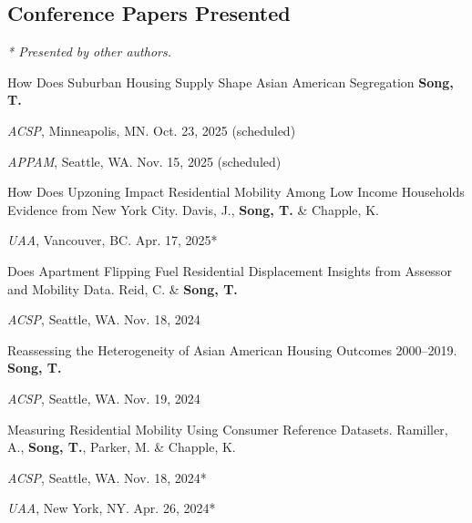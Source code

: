 \documentclass[11pt,letterpaper]{article}
\newcommand{\listitemspace}{0.25em}
\renewenvironment{itemize}
{\begin{list}{}{\setlength{\leftmargin}{1em}
\setlength{\parskip}{0em}
\setlength{\itemsep}{\listitemspace}
\setlength{\parsep}{\listitemspace}}}
{\end{list}}
\newcommand{\term}[1]{(#1)}     %
\begin{document}
\subsection{Conference Papers Presented}
{\footnotesize\emph{* Presented by other authors.}}
\begin{itemize}
  \item How Does Suburban Housing Supply Shape Asian American Segregation \textbf{Song, T.}
    \begin{itemize}
      \addtolength{\leftskip}{1em}\setlength{\itemsep}{-0.4em}
      \item[•] \emph{ACSP}, Minneapolis, MN. Oct. 23, 2025 \term{scheduled}
      \item[•] \emph{APPAM}, Seattle, WA. Nov. 15, 2025 \term{scheduled}
    \end{itemize}

  \item How Does Upzoning Impact Residential Mobility Among Low Income Households Evidence from New York City. Davis, J., \textbf{Song, T.} \& Chapple, K.
    \begin{itemize}
      \addtolength{\leftskip}{1em}\setlength{\itemsep}{-0.4em}
      \item[•] \emph{UAA}, Vancouver, BC. Apr. 17, 2025*
    \end{itemize}

  \item Does Apartment Flipping Fuel Residential Displacement Insights from Assessor and Mobility Data. Reid, C. \& \textbf{Song, T.}
    \begin{itemize}
      \addtolength{\leftskip}{1em}\setlength{\itemsep}{-0.4em}
      \item[•] \emph{ACSP}, Seattle, WA. Nov. 18, 2024
    \end{itemize}

  \item Reassessing the Heterogeneity of Asian American Housing Outcomes 2000–2019. \textbf{Song, T.}
    \begin{itemize}
      \addtolength{\leftskip}{1em}\setlength{\itemsep}{-0.4em}
      \item[•] \emph{ACSP}, Seattle, WA. Nov. 19, 2024
    \end{itemize}

  \item Measuring Residential Mobility Using Consumer Reference Datasets. Ramiller, A., \textbf{Song, T.}, Parker, M. \& Chapple, K.
    \begin{itemize}
      \addtolength{\leftskip}{1em}\setlength{\itemsep}{-0.4em}
      \item[•] \emph{ACSP}, Seattle, WA. Nov. 18, 2024*
      \item[•] \emph{UAA}, New York, NY. Apr. 26, 2024*
    \end{itemize}


\end{itemize}
\end{document}

